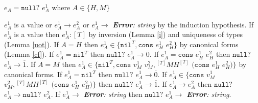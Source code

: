 \begin{case}

$e_{A}=\mathtt{null?}$ $e_{A}^{1}$ where $A\in\lbrace H,M\rbrace$

$e_{A}^{1}$ is a value or $e_{A}^{1}\rightarrow e_{A}^{2}$ or $e_{A}^{1}\rightarrow$ \emph{\textbf{Error}: string} by the induction hypothesis.  If $e_{A}^{1}$ is a value then $e_{A}^{1}:[T]$ by inversion (Lemma \ref{i}) and uniqueness of types (Lemma \ref{uot}).  If $A=H$ then $e_{A}^{1}\in\lbrace\mathtt{nil}^{T},\mathtt{cons}$ $e_{H}^{1}$ $e_{H}^{2}\rbrace$ by canonical forms (Lemma \ref{cf}).  If $e_{A}^{1}=\mathtt{nil}^{T}$ then $\mathtt{null?}$ $e_{A}^{1}\rightarrow\overline{0}$.  If $e_{A}^{1}=\mathtt{cons}$ $e_{H}^{1}$ $e_{H}^{2}$ then $\mathtt{null?}$ $e_{A}^{1}\rightarrow\overline{1}$.  If $A=M$ then $e_{A}^{1}\in\lbrace\mathtt{nil}^{T},\mathtt{cons}$ $v_{M}^{1}$ $v_{M}^{2},{^{[T]}M}H^{[T]}$ $(\mathtt{cons}$ $e_{H}^{1}$ $e_{H}^{2})\rbrace$ by canonical forms.  If $e_{A}^{1}=\mathtt{nil}^{T}$ then $\mathtt{null?}$ $e_{A}^{1}\rightarrow\overline{0}$.  If $e_{A}^{1}\in\lbrace\mathtt{cons}$ $v_{M}^{1}$ $v_{M}^{2},{^{[T]}M}H^{[T]}$ $(\mathtt{cons}$ $e_{H}^{1}$ $e_{H}^{2})\rbrace$ then $\mathtt{null?}$ $e_{A}^{1}\rightarrow\overline{1}$.  If $e_{A}^{1}\rightarrow e_{A}^{2}$ then $\mathtt{null?}$ $e_{A}^{1}\rightarrow\mathtt{null?}$ $e_{A}^{2}$.  If $e_{A}^{1}\rightarrow$ \emph{\textbf{Error}: string} then $\mathtt{null?}$ $e_{A}^{1}\rightarrow$ \emph{\textbf{Error}: string}.

\end{case}